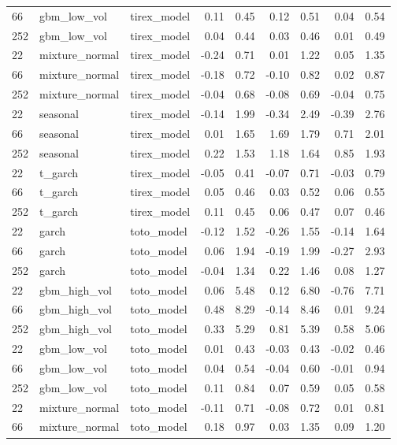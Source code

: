 {\begin{tabular}{lllrrrrrr}
66 & gbm\_low\_vol & tirex\_model & 0.11 & 0.45 & 0.12 & 0.51 & 0.04 & 0.54 \\
252 & gbm\_low\_vol & tirex\_model & 0.04 & 0.44 & 0.03 & 0.46 & 0.01 & 0.49 \\
\midrule
22 & mixture\_normal & tirex\_model & -0.24 & 0.71 & 0.01 & 1.22 & 0.05 & 1.35 \\
66 & mixture\_normal & tirex\_model & -0.18 & 0.72 & -0.10 & 0.82 & 0.02 & 0.87 \\
252 & mixture\_normal & tirex\_model & -0.04 & 0.68 & -0.08 & 0.69 & -0.04 & 0.75 \\
\midrule
22 & seasonal & tirex\_model & -0.14 & 1.99 & -0.34 & 2.49 & -0.39 & 2.76 \\
66 & seasonal & tirex\_model & 0.01 & 1.65 & 1.69 & 1.79 & 0.71 & 2.01 \\
252 & seasonal & tirex\_model & 0.22 & 1.53 & 1.18 & 1.64 & 0.85 & 1.93 \\
\midrule
22 & t\_garch & tirex\_model & -0.05 & 0.41 & -0.07 & 0.71 & -0.03 & 0.79 \\
66 & t\_garch & tirex\_model & 0.05 & 0.46 & 0.03 & 0.52 & 0.06 & 0.55 \\
252 & t\_garch & tirex\_model & 0.11 & 0.45 & 0.06 & 0.47 & 0.07 & 0.46 \\
\midrule
22 & garch & toto\_model & -0.12 & 1.52 & -0.26 & 1.55 & -0.14 & 1.64 \\
66 & garch & toto\_model & 0.06 & 1.94 & -0.19 & 1.99 & -0.27 & 2.93 \\
252 & garch & toto\_model & -0.04 & 1.34 & 0.22 & 1.46 & 0.08 & 1.27 \\
\midrule
22 & gbm\_high\_vol & toto\_model & 0.06 & 5.48 & 0.12 & 6.80 & -0.76 & 7.71 \\
66 & gbm\_high\_vol & toto\_model & 0.48 & 8.29 & -0.14 & 8.46 & 0.01 & 9.24 \\
252 & gbm\_high\_vol & toto\_model & 0.33 & 5.29 & 0.81 & 5.39 & 0.58 & 5.06 \\
\midrule
22 & gbm\_low\_vol & toto\_model & 0.01 & 0.43 & -0.03 & 0.43 & -0.02 & 0.46 \\
66 & gbm\_low\_vol & toto\_model & 0.04 & 0.54 & -0.04 & 0.60 & -0.01 & 0.94 \\
252 & gbm\_low\_vol & toto\_model & 0.11 & 0.84 & 0.07 & 0.59 & 0.05 & 0.58 \\
\midrule
22 & mixture\_normal & toto\_model & -0.11 & 0.71 & -0.08 & 0.72 & 0.01 & 0.81 \\
66 & mixture\_normal & toto\_model & 0.18 & 0.97 & 0.03 & 1.35 & 0.09 & 1.20 \\

\end{tabular}}
